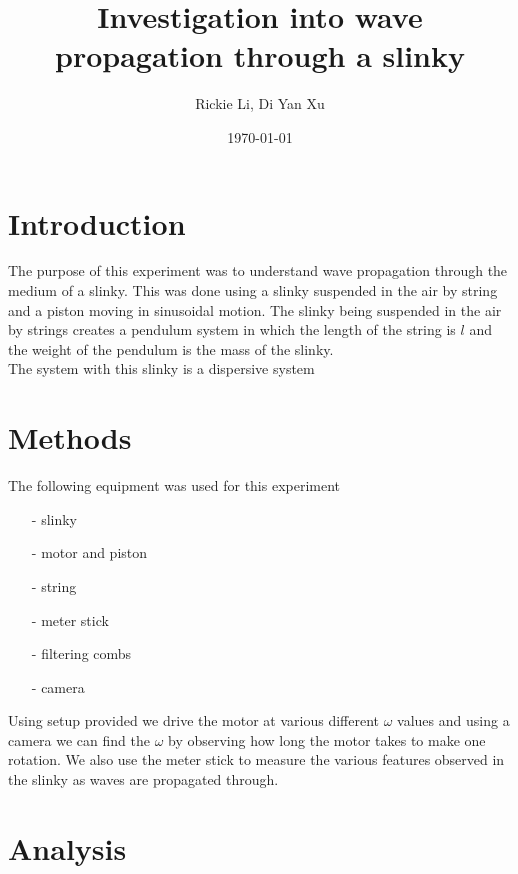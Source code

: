\documentclass{article}
\title{Investigation into wave propagation through a slinky}
\author{Rickie Li, Di Yan Xu}
\date{\today}
\begin{document}
\maketitle

\newpage

\section{Introduction}
The purpose of this experiment was to understand wave propagation through the
medium of a slinky. This was done using a slinky suspended in the air by string
and a piston moving in sinusoidal motion. The slinky being suspended in the air
by strings creates a pendulum system in which the length of the string is $l$
and the weight of the pendulum is the mass of the slinky.\\
The system with this slinky is a dispersive system

\section{Methods}
The following equipment was used for this experiment
\begin{itemize}
    \item[-] slinky
    \item[-] motor and piston
    \item[-] string
    \item[-] meter stick
    \item[-] filtering combs 
    \item[-] camera
\end{itemize}
Using setup provided we drive the motor at various different $\omega$ values
and using a camera we can find the $\omega$ by observing how long the motor
takes to make one rotation. We also use the meter stick to measure the various
features observed in the slinky as waves are propagated through.

\newpage
\section{Analysis}
\end{document}
